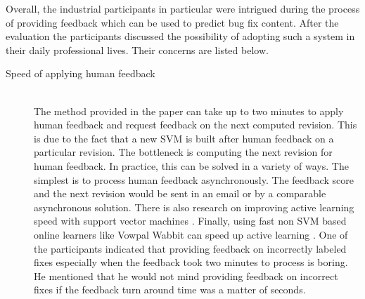 \documentclass[10pt, conference, letterpaper, compsocconf]{IEEEtran}
\begin{document}
Overall, the industrial participants in particular were intrigued during the process of providing feedback which can be used to predict bug fix content.
After the evaluation the participants discussed the possibility of adopting such a system in their daily professional lives. Their concerns are listed below.
\begin{description}
\item[Speed of applying human feedback] \hfill \\
The method provided in the paper can take up to two minutes to apply human feedback and request feedback on the next computed revision.
This is due to the fact that a new SVM is built after human feedback on a particular revision. The bottleneck is computing the next revision for human feedback.
In practice, this can be solved in a variety of ways.
The simplest is to process human feedback asynchronously. The feedback score and the next revision would be sent in an email or by a comparable asynchronous solution.
There is also research on improving active learning speed with support vector machines \cite{glasmachers2008second}.
Finally, using fast non SVM based online learners like Vowpal Wabbit can speed up active learning \cite{langford2009sparse} .
One of the participants indicated that providing feedback on incorrectly labeled fixes especially when the feedback took two minutes to process is boring.
 He mentioned that he would not mind providing feedback on incorrect fixes if the feedback turn around time was a matter of seconds.


\end{description}
\end{document}
